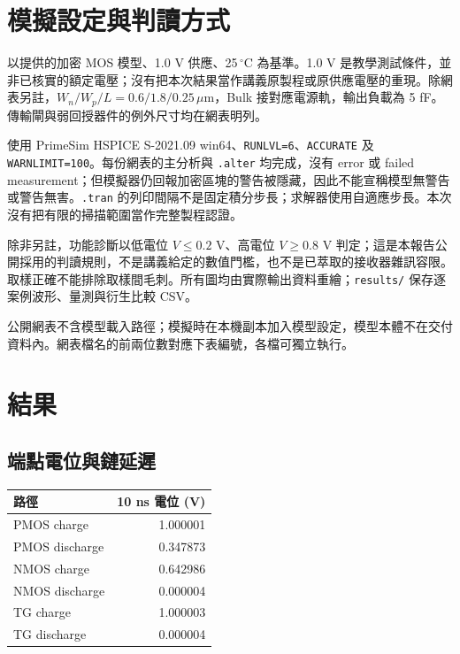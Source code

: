 \section{模擬設定與判讀方式}

以提供的加密 MOS 模型、1.0 V 供應、25\,$^\circ$C 為基準。1.0 V 是教學測試條件，並非已核實的額定電壓；沒有把本次結果當作講義原製程或原供應電壓的重現。除網表另註，$W_n/W_p/L=0.6/1.8/0.25\,\mu\mathrm m$，Bulk 接對應電源軌，輸出負載為 5 fF。傳輸閘與弱回授器件的例外尺寸均在網表明列。

使用 PrimeSim HSPICE S-2021.09 win64、\texttt{RUNLVL=6}、\texttt{ACCURATE} 及 \texttt{WARNLIMIT=100}。每份網表的主分析與 \texttt{.alter} 均完成，沒有 error 或 failed measurement；但模擬器仍回報加密區塊的警告被隱藏，因此不能宣稱模型無警告或警告無害。\texttt{.tran} 的列印間隔不是固定積分步長；求解器使用自適應步長。本次沒有把有限的掃描範圍當作完整製程認證。

除非另註，功能診斷以低電位 $V\leq0.2$ V、高電位 $V\geq0.8$ V 判定；這是本報告公開採用的判讀規則，不是講義給定的數值門檻，也不是已萃取的接收器雜訊容限。取樣正確不能排除取樣間毛刺。所有圖均由實際輸出資料重繪；\texttt{results/} 保存逐案例波形、量測與衍生比較 CSV。

公開網表不含模型載入路徑；模擬時在本機副本加入模型設定，模型本體不在交付資料內。網表檔名的前兩位數對應下表編號，各檔可獨立執行。

\section{結果}

\subsection{端點電位與鏈延遲}

\begin{center}
\small
\setlength{\tabcolsep}{4pt}
\begin{tabular}{lr}
\toprule
路徑 & 10 ns 電位 (V) \\
\midrule
PMOS charge & 1.000001 \\
PMOS discharge & 0.347873 \\
NMOS charge & 0.642986 \\
NMOS discharge & 0.000004 \\
TG charge & 1.000003 \\
TG discharge & 0.000004 \\
\bottomrule
\end{tabular}
\end{center}

